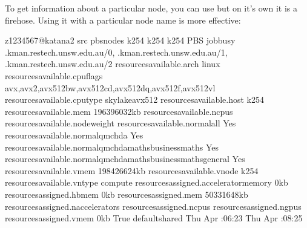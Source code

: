 \documentclass[letterpaper,10pt,english]{sphinxmanual}
\begin{document}
To get information about a particular node, you can use  but on it’s own it is a firehose. Using it with a particular node name is more effective:

\begin{sphinxVerbatim}[commandchars=\\\{\}]
\PYG{o}{[}z1234567@katana2 src\PYG{o}{]}\PYGZdl{} pbsnodes k254
k254
       k254
       PBS
       job\PYGZhy{}busy
       
       .kman.restech.unsw.edu.au/0, .kman.restech.unsw.edu.au/1, .kman.restech.unsw.edu.au/2
     resources\PYGZus{}available.arch  linux
     resources\PYGZus{}available.cpuflags  avx,avx2,avx512bw,avx512cd,avx512dq,avx512f,avx512vl
     resources\PYGZus{}available.cputype  skylake\PYGZhy{}avx512
     resources\PYGZus{}available.host  k254
     resources\PYGZus{}available.mem  196396032kb
     resources\PYGZus{}available.ncpus  
     resources\PYGZus{}available.node\PYGZus{}weight  
     resources\PYGZus{}available.normal\PYGZhy{}all  Yes
     resources\PYGZus{}available.normal\PYGZhy{}qmchda  Yes
     resources\PYGZus{}available.normal\PYGZhy{}qmchda\PYGZhy{}maths\PYGZus{}business\PYGZhy{}maths  Yes
     resources\PYGZus{}available.normal\PYGZhy{}qmchda\PYGZhy{}maths\PYGZus{}business\PYGZhy{}maths\PYGZhy{}general  Yes
     resources\PYGZus{}available.vmem  198426624kb
     resources\PYGZus{}available.vnode  k254
     resources\PYGZus{}available.vntype  compute
     resources\PYGZus{}assigned.accelerator\PYGZus{}memory  0kb
     resources\PYGZus{}assigned.hbmem  0kb
     resources\PYGZus{}assigned.mem  50331648kb
     resources\PYGZus{}assigned.naccelerators  
     resources\PYGZus{}assigned.ncpus  
     resources\PYGZus{}assigned.ngpus  
     resources\PYGZus{}assigned.vmem  0kb
       True
       default\PYGZus{}shared
       Thu Apr  :06:23 
       Thu Apr  :08:25 
\end{sphinxVerbatim}
\end{document}
